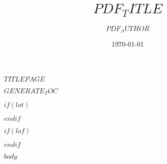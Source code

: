 \documentclass[$FONT_SIZE$]{scrartcl}
\date{\today}
\title{$PDF_TITLE$}
\author{$PDF_AUTHOR$}
\begin{document}
$TITLEPAGE$

$GENERATE_TOC$

$if(lot)$
\listoftables
$endif$

$if(lof)$
\listoffigures
$endif$

$body$
\end{document}
